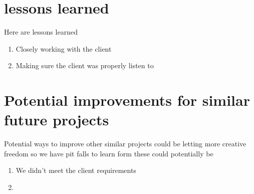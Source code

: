 \documentclass{article}
\begin{document}
\section{lessons learned}
Here are lessons learned
\begin{enumerate}
	\item Closely working with the client
	\item Making sure the client was properly listen to 
\end{enumerate}


\section{Potential improvements for similar future projects} 
Potential ways to improve other similar projects could be letting more creative freedom so we have pit falls to learn form these could potentially be
\begin{enumerate}
	\item We didn't meet the client requirements
	\item 

\end{enumerate}
\end{document}
